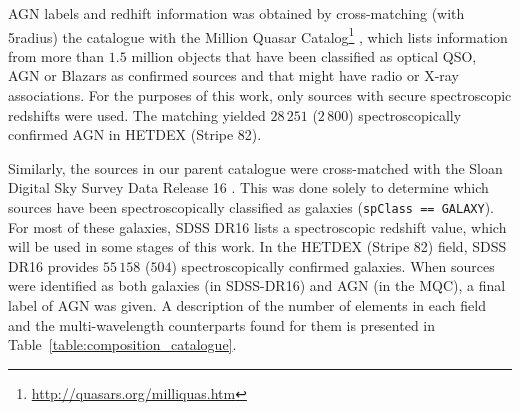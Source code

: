 \documentclass{aa}
\begin{document}
AGN labels and redhift information was obtained by cross-matching (with 5\arcsec radius) the catalogue with the Million Quasar Catalog\footnote{\url{http://quasars.org/milliquas.htm}} \citep[MQC, v7.4d;][]{2021arXiv210512985F}, which lists information from more than $1.5$ million objects that have been classified as optical QSO, AGN or Blazars as confirmed sources and that might have radio or X-ray associations. 
For the purposes of this work, only sources with secure spectroscopic redshifts were used. The matching yielded $28\,251$ ($2\,800$) spectroscopically confirmed AGN in HETDEX (Stripe 82). 

Similarly, the sources in our parent catalogue were cross-matched
with the Sloan Digital Sky Survey Data Release 16 \citep[SDSS-DR16;][]{2020ApJS..249....3A}. This was done solely to determine which sources have been spectroscopically classified as galaxies (\verb|spClass == GALAXY|). 
For most of these galaxies, SDSS DR16 lists a spectroscopic redshift value, which will be used in some stages of this work. In the HETDEX (Stripe 82) field,
SDSS DR16 provides $55\,158$ ($504$) spectroscopically confirmed galaxies. When sources were identified as both galaxies (in SDSS-DR16) and AGN (in the MQC), a final label of AGN was given. 
A description of the number of elements in each field and the multi-wavelength counterparts found for them is presented in Table~\ref{table:composition_catalogue}.

\begin{table}
\setlength{\tabcolsep}{3pt}
\caption{Composition of initial catalogue and number of cross matches with additional surveys and catalogues.}             %
\label{table:composition_catalogue}      %
\centering                          %
\end{table}
\end{document}
